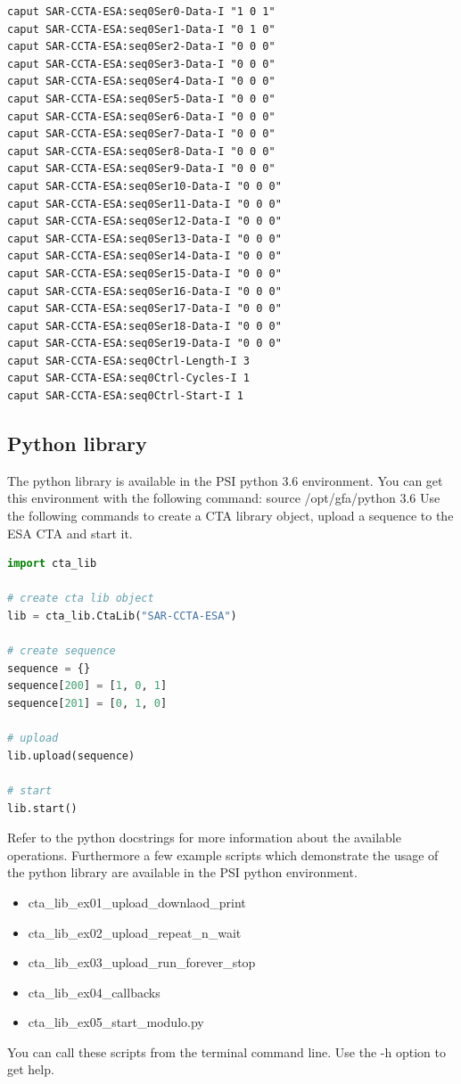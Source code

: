 \documentclass[12pt,a4paper]{article}
\begin{document}
\begin{minipage}{\linewidth}
\begin{lstlisting}[caption={caput listing}, label={lst:caput}, linewidth=\columnwidth]
caput SAR-CCTA-ESA:seq0Ser0-Data-I "1 0 1"
caput SAR-CCTA-ESA:seq0Ser1-Data-I "0 1 0"
caput SAR-CCTA-ESA:seq0Ser2-Data-I "0 0 0"
caput SAR-CCTA-ESA:seq0Ser3-Data-I "0 0 0"
caput SAR-CCTA-ESA:seq0Ser4-Data-I "0 0 0"
caput SAR-CCTA-ESA:seq0Ser5-Data-I "0 0 0"
caput SAR-CCTA-ESA:seq0Ser6-Data-I "0 0 0"
caput SAR-CCTA-ESA:seq0Ser7-Data-I "0 0 0"
caput SAR-CCTA-ESA:seq0Ser8-Data-I "0 0 0"
caput SAR-CCTA-ESA:seq0Ser9-Data-I "0 0 0"
caput SAR-CCTA-ESA:seq0Ser10-Data-I "0 0 0"
caput SAR-CCTA-ESA:seq0Ser11-Data-I "0 0 0"
caput SAR-CCTA-ESA:seq0Ser12-Data-I "0 0 0"
caput SAR-CCTA-ESA:seq0Ser13-Data-I "0 0 0"
caput SAR-CCTA-ESA:seq0Ser14-Data-I "0 0 0"
caput SAR-CCTA-ESA:seq0Ser15-Data-I "0 0 0"
caput SAR-CCTA-ESA:seq0Ser16-Data-I "0 0 0"
caput SAR-CCTA-ESA:seq0Ser17-Data-I "0 0 0"
caput SAR-CCTA-ESA:seq0Ser18-Data-I "0 0 0"
caput SAR-CCTA-ESA:seq0Ser19-Data-I "0 0 0"
caput SAR-CCTA-ESA:seq0Ctrl-Length-I 3
caput SAR-CCTA-ESA:seq0Ctrl-Cycles-I 1
caput SAR-CCTA-ESA:seq0Ctrl-Start-I 1
\end{lstlisting}
\end{minipage}

\subsection{Python library}
The python library is available in the PSI python 3.6 environment. You can get
this environment with the following command: source /opt/gfa/python 3.6
Use the following commands to create a CTA library object, upload a sequence
to the ESA CTA and start it.

\begin{lstlisting}[caption={python CTA lib}, label={lst:python_cta_lib}, language=Python]
import cta_lib

# create cta lib object
lib = cta_lib.CtaLib("SAR-CCTA-ESA")

# create sequence
sequence = {}
sequence[200] = [1, 0, 1]
sequence[201] = [0, 1, 0]

# upload
lib.upload(sequence)

# start
lib.start()
\end{lstlisting}

Refer to the python docstrings for more information about the available
operations.
Furthermore a few example scripts which demonstrate the usage of the python
library are available in the PSI python environment.
\begin{itemize}
\item
cta\_lib\_ex01\_upload\_downlaod\_print
\item
cta\_lib\_ex02\_upload\_repeat\_n\_wait
\item
cta\_lib\_ex03\_upload\_run\_forever\_stop
\item
cta\_lib\_ex04\_callbacks
\item
cta\_lib\_ex05\_start\_modulo.py
\end{itemize}
You can call these scripts from the terminal command line. Use the -h option to get help.
\end{document}
